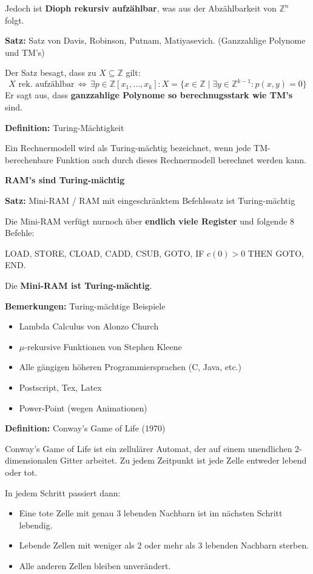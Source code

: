 \documentclass[a4paper,graphics,11pt]{article}
\newcommand{\Iff}[0]{\,\Longleftrightarrow\,}
\begin{document}
Jedoch ist \textbf{Dioph rekursiv aufzählbar}, was aus der Abzählbarkeit von $\mathbb{Z}^n$ folgt.

\strut

\textbf{Satz:} Satz von Davis, Robinson, Putnam, Matiyasevich. (Ganzzahlige Polynome und TM's)

Der Satz besagt, dass zu $X\subseteq \mathbb{Z}$ gilt:
$$
    X \text{ rek. aufzählbar} \Iff
    \exists p \in \mathbb{Z}[x_1,\dots,x_k] : X = \{x \in \mathbb{Z} \mid \exists y \in \mathbb{Z}^{k-1}: p(x,y) = 0\}
$$
Er sagt aus, dass \textbf{ganzzahlige Polynome so berechnugsstark wie TM's} sind.

\strut

\textbf{Definition:} Turing-Mächtigkeit

Ein Rechnermodell wird als Turing-mächtig bezeichnet, wenn jede TM-berechenbare Funktion
auch durch dieses Rechnermodell berechnet werden kann.

\textbf{RAM's sind Turing-mächtig}

\strut

\textbf{Satz:} Mini-RAM / RAM mit eingeschränktem Befehlssatz ist Turing-mächtig

Die Mini-RAM verfügt nurnoch über \textbf{endlich viele Register} und folgende 8 Befehle:

LOAD, STORE, CLOAD, CADD, CSUB, GOTO, IF $c(0) > 0$ THEN GOTO, END.

Die \textbf{Mini-RAM ist Turing-mächtig}.

\newpage

\textbf{Bemerkungen:} Turing-mächtige Beispiele
\begin{itemize}
    \item Lambda Calculus von Alonzo Church
    \item $\mu$-rekursive Funktionen von Stephen Kleene
    \item Alle gängigen höheren Programmiersprachen (C, Java, etc.)
    \item Postscript, Tex, Latex
    \item Power-Point (wegen Animationen)
\end{itemize}

\strut

\textbf{Definition:} Conway's Game of Life (1970)

Conway's Game of Life ist ein zellulärer Automat, der auf einem unendlichen 2-dimensionalen Gitter
arbeitet. Zu jedem Zeitpunkt ist jede Zelle entweder lebend oder tot.

In jedem Schritt passiert dann:
\begin{itemize}
    \item Eine tote Zelle mit genau 3 lebenden Nachbarn ist im nächsten Schritt lebendig.
    \item Lebende Zellen mit weniger als 2 oder mehr als 3 lebenden Nachbarn sterben.
    \item Alle anderen Zellen bleiben unverändert.
\end{itemize}
\end{document}
